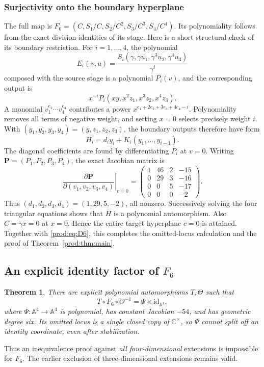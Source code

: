 \documentclass[11pt]{article}
\numberwithin{equation}{section}
\theoremstyle{plain}
\newtheorem{theorem}{Theorem}[section]
\theoremstyle{definition}
\theoremstyle{remark}
\newcommand{\C}{\mathbb{C}}
\newcommand{\A}{\mathbb{A}}
\newcommand{\id}{\mathrm{id}}
\begin{document}
\subsubsection{Surjectivity onto the boundary hyperplane}
The full map is $F_6=(C,S_1/C,S_2/C^2,S_3/C^3,S_4/C^4)$.
Its polynomiality follows from the exact division identities of its stage.
Here is a short structural check of its boundary restriction.
For $i=1,\ldots,4$, the polynomial
\[
 E_i(\gamma,u)=\frac{S_i(\gamma,\gamma u_1,\gamma^3u_2,\gamma^4u_3)}{\gamma^i}
\]
composed with the source stage is a polynomial $P_i(v)$, and the corresponding
output is
\[
 x^{-i}P_i(xy,x^2z_1,x^3z_2,x^4z_3).
\]
A monomial $v_1^{e_1}\cdots v_4^{e_4}$ contributes a power
$x^{e_1+2e_2+3e_3+4e_4-i}$. Polynomiality removes all terms of negative
weight, and setting $x=0$ selects precisely weight $i$.
With $(y_1,y_2,y_3,y_4)=(y,z_1,z_2,z_3)$, the boundary outputs therefore have form
\[
 H_i=d_i y_i+K_i(y_1,\ldots,y_{i-1}).
\]
The diagonal coefficients are found by differentiating $P_i$ at $v=0$.
Writing $\mathbf P=(P_1,P_2,P_3,P_4)$, the exact Jacobian matrix is
\[
 \left.\frac{\partial\mathbf P}{\partial(v_1,v_2,v_3,v_4)}\right|_{v=0}
 =\begin{pmatrix}
 1&46&2&-15\\0&29&3&-16\\0&0&5&-17\\0&0&0&-2
 \end{pmatrix}.
\]
Thus $(d_1,d_2,d_3,d_4)=(1,29,5,-2)$, all nonzero. Successively solving
the four triangular equations shows that $H$ is a polynomial automorphism.
Also $C=\gamma x=0$ at $x=0$. Hence the entire target hyperplane $c=0$ is
attained. Together with \eqref{prod:eq:D6}, this completes the omitted-locus
calculation and the proof of Theorem~\ref{prod:thm:main}.

\subsection{An explicit identity factor of \texorpdfstring{$F_6$}{F6}}
\begin{theorem}\label{prod:thm:F6-split}
There are explicit polynomial automorphisms $T,\Theta$ such that
\[
 T\circ F_6\circ\Theta^{-1}=\Psi\times\id_{\A^1},
\]
where $\Psi:\A^4\to\A^4$ is polynomial, has constant Jacobian $-54$,
and has geometric degree six. Its omitted locus is a single closed copy
of $\C^\times$, so $\Psi$ cannot split off an identity coordinate, even
after stabilization.
\end{theorem}
Thus an inequivalence proof against \emph{all four-dimensional} extensions
is impossible for $F_6$. The earlier exclusion of three-dimensional
extensions remains valid.
\end{document}
